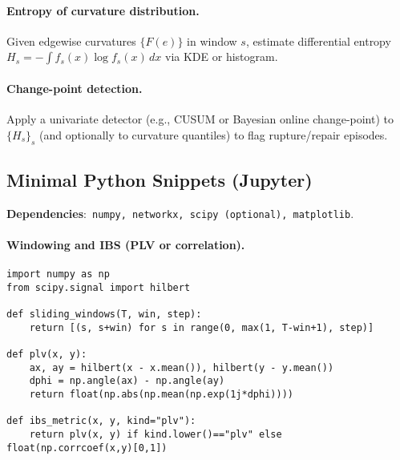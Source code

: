 \documentclass{article}
\theoremstyle{definition}
\begin{document}
\paragraph{Entropy of curvature distribution.}
Given edgewise curvatures $\{F(e)\}$ in window $s$, estimate differential entropy
$H_s = -\!\int f_s(x)\log f_s(x)\,dx$ via KDE or histogram.

\paragraph{Change-point detection.}
Apply a univariate detector (e.g., CUSUM or Bayesian online change-point) to
$\{H_s\}_s$ (and optionally to curvature quantiles) to flag rupture/repair episodes.

\subsection{Minimal Python Snippets (Jupyter)}
\textbf{Dependencies}:\ \texttt{numpy, networkx, scipy (optional), matplotlib}.

\paragraph{Windowing and IBS (PLV or correlation).}
\begin{verbatim}
import numpy as np
from scipy.signal import hilbert

def sliding_windows(T, win, step):
    return [(s, s+win) for s in range(0, max(1, T-win+1), step)]

def plv(x, y):
    ax, ay = hilbert(x - x.mean()), hilbert(y - y.mean())
    dphi = np.angle(ax) - np.angle(ay)
    return float(np.abs(np.mean(np.exp(1j*dphi))))

def ibs_metric(x, y, kind="plv"):
    return plv(x, y) if kind.lower()=="plv" else float(np.corrcoef(x,y)[0,1])
\end{verbatim}
\end{document}

